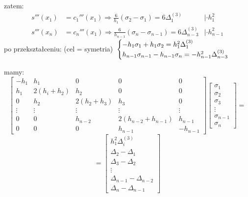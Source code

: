     \begin{frame}
    	zatem:
        \begin{align*}
        	s'''(x_{1})&=c_{1}'''(x_{1}) \Rightarrow
            \frac{6}{h_{1}}(\sigma_{2}-\sigma_{1})=6\Delta_{1}^{(3)}
            &|\cdot h_{1}^{2}
            \\
            s'''(x_{n})&=c_{n}'''(x_{1}) \Rightarrow
            \frac{6}{h_{n-1}}(\sigma_{n}-\sigma_{n-1})=6\Delta_{n-3}^{(3)}
            &|\cdot h_{n-1}^{2}
        \end{align*}
        po przekształceniu: (cel = symetria)
        $\newline \newline
        \begin{cases}
        	-h_{1}\sigma_{1}+h_{1}\sigma_{2}=h_{1}^{2}\Delta_{1}^{(3)}
            \\
		h_{n-1}\sigma_{n-1}-h_{n-1}\sigma_{n}=-h_{n-1}^{2}\Delta_{n-3}^{(3)}
        \end{cases}
        $
    \end{frame}
    \begin{frame}
    	mamy:
        \[
        \begin{bmatrix}
    -h_{1} & h_{1} & 0 & 0  & 0 \\
    h_{1} & 2(h_{i}+h_{2}) & h_{2} & 0  & 0 \\
    0 & h_{2} & 2(h_{2}+h_{3}) & h_{3} & 0 \\
    \vdots & \vdots & \vdots & \vdots & \vdots \\
    0 & 0 & h_{n-2} & 2(h_{n-2}+h_{n-1}) & h_{n-1} \\
    0 & 0 & 0 & h_{n-1}  & -h_{n-1}
		\end{bmatrix}
        \begin{bmatrix}
        	\sigma_{1} \\
            \sigma_{2} \\
            \sigma_{3} \\
            \vdots \\
            \sigma_{n-1} \\
            \sigma_{n}
        \end{bmatrix}
       	=
        \]
        \[	=
        	\begin{bmatrix}
        		h_{1}^{2}\Delta^{(3)}_{i} \\
                \Delta_{2} - \Delta_{1} \\
                \Delta_{3} - \Delta_{2} \\
                \vdots \\ 
                \Delta_{n-1} - \Delta_{n-2} \\
                \Delta_{n} - \Delta_{n-1}
        	\end{bmatrix}
        \]
    \end{frame}
